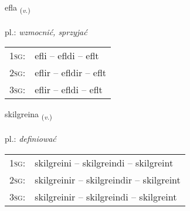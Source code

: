 \documentclass[frontgrid, backgrid]{flacards}\usepackage[]{graphicx}\usepackage[]{xcolor}
\begin{document}
\renewcommand{\flhead}{\vskip5pt \fboxsep=0pt {\small\bfseries\footnotesize Sagnorð | Verb}}
\renewcommand{\fcfoot}{\vskip5pt \fboxsep=0pt \hspace{2pt}{\small\bfseries\footnotesize 1K}}

\renewcommand{\blhead}{\vskip5pt {\small\bfseries\footnotesize Sagnorð | Verb }}
\renewcommand{\bcfoot}{\vskip5pt \hspace{2pt}{\small\bfseries\footnotesize 1K}}


{efla \small{\textsubscript{(\textit{v.})}} \\[1ex] %
\textphonetic{[ɛpla]} \\
pl.: \emph{wzmocnić, sprzyjać} \\  [2ex]
\renewcommand*{\arraystretch}{0.8}
\begin{tabular}{p{1cm}l}
\textsc{1sg}: & efli -- efldi -- eflt \\ 
\textsc{2sg}: & eflir -- efldir -- eflt \\ 
\textsc{3sg}: & eflir -- efldi -- eflt \\ 
\end{tabular}
}

\renewcommand{\flhead}{\vskip5pt \fboxsep=0pt {\small\bfseries\footnotesize Sagnorð | Verb}}
\renewcommand{\fcfoot}{\vskip5pt \fboxsep=0pt \hspace{2pt}{\small\bfseries\footnotesize 1K}}

\renewcommand{\blhead}{\vskip5pt {\small\bfseries\footnotesize Sagnorð | Verb }}
\renewcommand{\bcfoot}{\vskip5pt \hspace{2pt}{\small\bfseries\footnotesize 1K}}


{skilgreina \small{\textsubscript{(\textit{v.})}} \\[1ex] %
\textphonetic{[scɪlkreina]} \\
pl.: \emph{definiować} \\  [2ex]
\renewcommand*{\arraystretch}{0.8}
\begin{tabular}{p{1cm}l}
\textsc{1sg}: & skilgreini -- skilgreindi -- skilgreint \\ 
\textsc{2sg}: & skilgreinir -- skilgreindir -- skilgreint \\ 
\textsc{3sg}: & skilgreinir -- skilgreindi -- skilgreint \\ 
\end{tabular}
}
\end{document}
